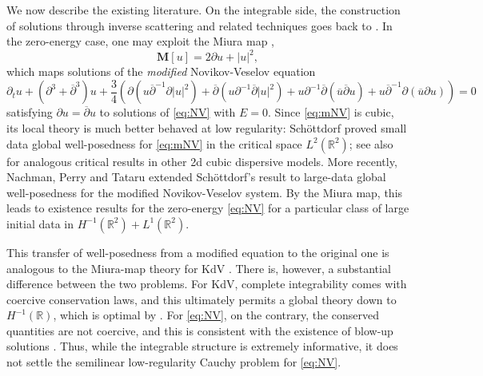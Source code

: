 \documentclass[a4paper,
11pt,  reqno]{amsart}
\newcommand{\5}{\textup{V}}
\theoremstyle{remark}
\newcommand{\R}{\mathbb{R}}
\numberwithin{equation}{section}
\numberwithin{theorem}{section}
\begin{document}
We now describe the existing literature. On the integrable side, the construction of
solutions through inverse scattering and related techniques goes back to
\cite{BLMP, Tsai, Perry, MusicPerry}.  In the zero-energy case, one may exploit the Miura map
\cite{Bogdanov},
\begin{equation}
\mathbf{M}[u]= 2\partial u + |u|^2,
\end{equation}
which maps solutions of the \emph{modified} Novikov-Veselov equation
\begin{equation}
\partial_t u + (\partial^3+\overline{\partial}^3) u + \frac34\left(\partial(u\overline{\partial}^{-1}\partial |u|^2) + \overline{\partial}(u\partial^{-1}\overline{\partial}|u|^2) + u\partial^{-1}\overline{\partial}(\overline{u}\overline{\partial}u) + u\overline{\partial}^{-1}\partial(\overline{u}\partial u)\right)=0\label{eq:mNV}\tag{mNV}
\end{equation}
satisfying $\partial u=\overline{\partial} u$ to solutions of \eqref{eq:NV} with $E=0$. 
Since \eqref{eq:mNV} is cubic, its local theory is much better behaved at low regularity:
Schöttdorf \cite{Schottdorf} proved small data global well-posedness for \eqref{eq:mNV} in the critical space $L^2(\R^2)$;
see also \cite{MPS_Dysthe, CorreiaKinoshita} for analogous critical results in other
2d cubic dispersive models. More recently, Nachman, Perry and Tataru
\cite{NPT_mNV} extended Schöttdorf's result to large-data global well-posedness for the modified
Novikov-Veselov system. By the Miura map, this leads to existence
results for the zero-energy \eqref{eq:NV} for a particular class of large initial data in $H^{-1}(\R^2)+L^1(\R^2)$.

\medskip



This transfer of well-posedness from a modified equation to the original one is analogous to the Miura-map
theory for KdV \cite{Miura, KPST_miura, CKSTT_sharp_kdv, KT06, BuckmasterKoch,
KillipVisan_kdv}. There is, however, a substantial difference between the two problems.
For KdV, complete integrability comes with coercive conservation laws, and this ultimately
permits a global theory down to $H^{-1}(\R)$, which is optimal by \cite{Molinet_ill_line}.
For \eqref{eq:NV}, on the contrary, the conserved quantities are not coercive, and this is
consistent with the existence of blow-up solutions \cite{TaimanovTsarev}. Thus, while the
integrable structure is extremely informative, it does not settle the semilinear
low-regularity Cauchy problem for \eqref{eq:NV}.
\end{document}
